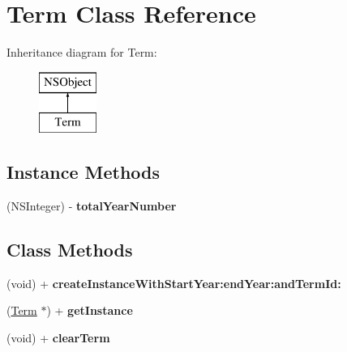 \hypertarget{interface_term}{\section{Term Class Reference}
\label{interface_term}
}
Inheritance diagram for Term\+:\begin{figure}[H]
\begin{center}
\leavevmode
\includegraphics[height=2.000000cm]{interface_term}
\end{center}
\end{figure}
\subsection*{Instance Methods}
\begin{DoxyCompactItemize}
\item 
\hypertarget{interface_term_ae7418c7e7d2d690f10d789fdcf77bd1d}{(N\+S\+Integer) -\/ {\bfseries total\+Year\+Number}}\label{interface_term_ae7418c7e7d2d690f10d789fdcf77bd1d}

\end{DoxyCompactItemize}
\subsection*{Class Methods}
\begin{DoxyCompactItemize}
\item 
\hypertarget{interface_term_ac2d139ddaf21d295e532930469acba21}{(void) + {\bfseries create\+Instance\+With\+Start\+Year\+:end\+Year\+:and\+Term\+Id\+:}}\label{interface_term_ac2d139ddaf21d295e532930469acba21}

\item 
\hypertarget{interface_term_a4cd86e0f1005b3506cca47654a8be9bb}{(\hyperlink{interface_term}{Term} $\ast$) + {\bfseries get\+Instance}}\label{interface_term_a4cd86e0f1005b3506cca47654a8be9bb}

\item 
\hypertarget{interface_term_ae115c46bc052f8f55e5175a497960be4}{(void) + {\bfseries clear\+Term}}\label{interface_term_ae115c46bc052f8f55e5175a497960be4}

\end{DoxyCompactItemize}

